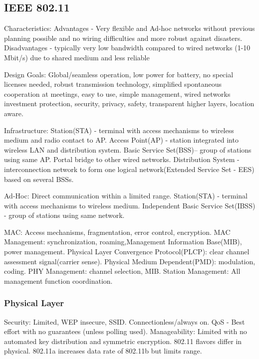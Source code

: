 \documentclass[9pt]{extarticle}
\begin{document}
\begin{multicols}{2}
\subsection{IEEE 802.11}

Characteristics:  Advantages - Very flexible and Ad-hoc networks without previous planning possible and no wiring difficulties and more robust against disasters. Disadvantages - typically very low bandwidth compared to wired networks (1-10 Mbit/s) due to shared medium and less reliable

Design Goals: Global/seamless operation, low power for battery, no special licenses needed, robust transmission technology, simplified spontaneous cooperation at meetings, easy to use, simple management, wired networks investment protection, security, privacy, safety, transparent higher layers, location aware.

Infrastructure: Station(STA) - terminal with access mechanisms to wireless medium and radio contact to AP. Access Point(AP) - station integrated into wireless LAN and distribution system. Basic Service Set(BSS)– group of stations using same AP. Portal bridge to other wired networks. Distribution System - interconnection network to form one logical network(Extended Service Set - EES) based on several BSSs.

Ad-Hoc: Direct communication within a limited range. Station(STA) - terminal with access mechanisms to wireless medium. Independent Basic Service Set(IBSS) - group of stations using same network.

MAC: Access mechanisms, fragmentation, error control, encryption. MAC Management: synchronization, roaming,Management Information Base(MIB), power management. Physical Layer Convergence Protocol(PLCP): clear channel assessment signal(carrier sense).  Physical Medium Dependent(PMD): modulation, coding. PHY Management: channel selection, MIB. Station Management: All
management function coordination.

\subsubsection{Physical Layer}

Security: Limited, WEP insecure, SSID. Connectionless/always on. QoS - Best effort with no guarantees (unless polling used). Manageability: Limited with no automated key distribution and symmetric encryption. 802.11 flavors differ in physical. 802.11a increases data rate of 802.11b but limits range. 


\end{multicols}
\end{document}
